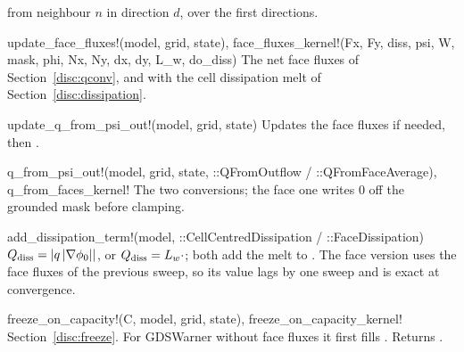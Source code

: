 \begin{fnlist}
   from neighbour $n$ in direction $d$, over the first  directions.
\item[update\_face\_fluxes!(model, grid, state), face\_fluxes\_kernel!(Fx, Fy, diss, psi, W, mask, phi, Nx, Ny, dx, dy, L\_w, do\_diss)] The
  net face fluxes of Section~\ref{disc:qconv}, and with  the cell dissipation melt of
  Section~\ref{disc:dissipation}.
\item[update\_q\_from\_psi\_out!(model, grid, state)] Updates the face fluxes if needed, then .
\item[q\_from\_psi\_out!(model, grid, state, ::QFromOutflow / ::QFromFaceAverage), q\_from\_faces\_kernel!] The two conversions; the face
  one writes 0 off the grounded mask before clamping.
\item[add\_dissipation\_term!(model, ::CellCentredDissipation / ::FaceDissipation)] $Q_{\rm diss} = |q\,|\nabla\phi_0||$, or
  $Q_{\rm diss} = L_w\cdot$; both add the melt to . The face version uses the face fluxes of the
  previous sweep, so its value lags by one sweep and is exact at convergence.
\item[freeze\_on\_capacity!(C, model, grid, state), freeze\_on\_capacity\_kernel!] Section~\ref{disc:freeze}. For GDSWarner without
  face fluxes it first fills . Returns .
\end{fnlist}

